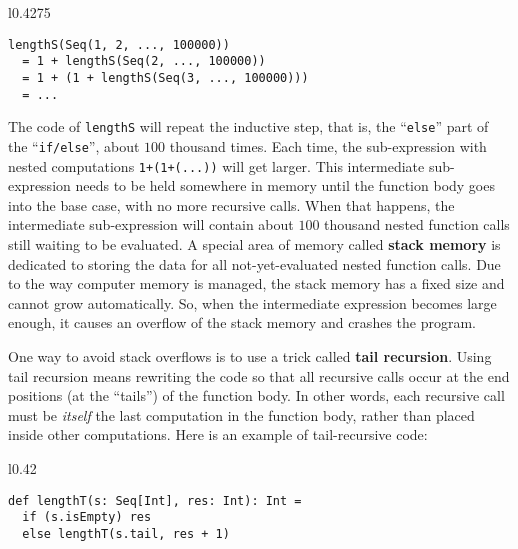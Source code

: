 \begin{wrapfigure}{l}{0.4275\columnwidth}%
\vspace{-1\baselineskip}
\begin{lstlisting}
lengthS(Seq(1, 2, ..., 100000))
  = 1 + lengthS(Seq(2, ..., 100000))
  = 1 + (1 + lengthS(Seq(3, ..., 100000)))
  = ...
\end{lstlisting}

\vspace{-1.5\baselineskip}
\end{wrapfigure}%

\noindent The code of \lstinline!lengthS! will repeat the inductive
step, that is, the \textsf{``}\lstinline!else!\textsf{''} part of the \textsf{``}\lstinline!if/else!\textsf{''},
about $100$ thousand times. Each time, the sub-expression with nested
computations \lstinline!1+(1+(...))! will get larger. This intermediate
sub-expression needs to be held somewhere in memory until the function
body goes into the base case, with no more recursive calls. When that
happens, the intermediate sub-expression will contain about $100$
thousand nested function calls still waiting to be evaluated. A special
area of memory called \textbf{stack memory} is
dedicated to storing the data for all not-yet-evaluated nested function
calls. Due to the way computer memory is managed, the stack memory
has a fixed size and cannot grow automatically. So, when the intermediate
expression becomes large enough, it causes an overflow of the stack
memory and crashes the program.

One way to avoid stack overflows is to use a trick called \textbf{tail
recursion}. Using tail recursion means rewriting
the code so that all recursive calls occur at the end positions (at
the \textsf{``}tails\textsf{''}) of the function body. In other words, each recursive
call must be \emph{itself} the last computation in the function body,
rather than placed inside other computations. Here is an example of
tail-recursive code:

\begin{wrapfigure}{l}{0.42\columnwidth}%
\vspace{-1.1\baselineskip}
\begin{lstlisting}
def lengthT(s: Seq[Int], res: Int): Int =
  if (s.isEmpty) res
  else lengthT(s.tail, res + 1)
\end{lstlisting}

\vspace{-1.5\baselineskip}
\end{wrapfigure}%

